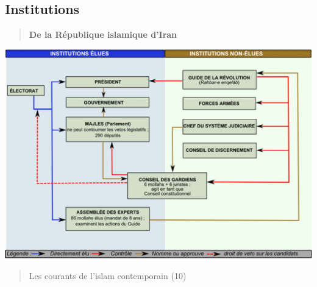 \hypertarget{institutions}{%
\subsection{Institutions}\label{institutions}}

\begin{quote}
\textbf{De la République islamique d'Iran}
\end{quote}

\includegraphics[width=\textwidth]{CourantsIslamContemporain/ImagesCourantsIslamContemporain/image3.jpeg}

\begin{quote}
Les courants de l'islam contemporain (10)
\end{quote}

